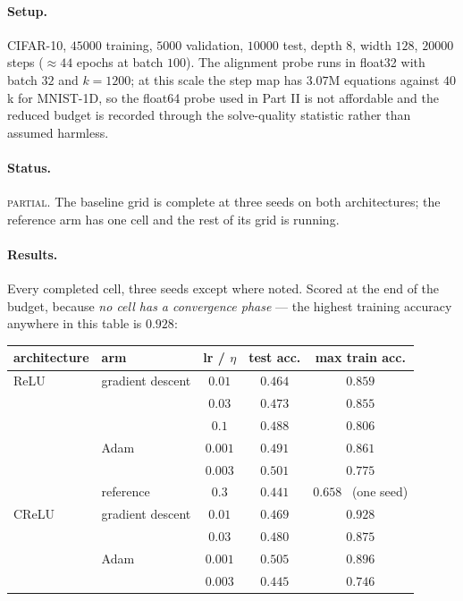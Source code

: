 \documentclass{article} %
\theoremstyle{plain}
\theoremstyle{definition}
\theoremstyle{remark}
\begin{document}
\paragraph{Setup.}
CIFAR-10, $45000$ training, $5000$ validation, $10000$ test, depth $8$, width $128$, $20000$ steps
($\approx 44$ epochs at batch $100$). The alignment probe runs in float32 with batch $32$ and
$k = 1200$; at this scale the step map has $3.07$M equations against $40$k for MNIST-1D, so the
float64 probe used in Part II is not affordable and the reduced budget is recorded through the
solve-quality statistic rather than assumed harmless.

\paragraph{Status.} \textsc{partial}. The baseline grid is complete at three seeds on both
architectures; the reference arm has one cell and the rest of its grid is running.

\paragraph{Results.} Every completed cell, three seeds except where noted. Scored at the end of the
budget, because \emph{no cell has a convergence phase} --- the highest training accuracy anywhere
in this table is $0.928$:

\begin{center}\small
\begin{tabular}{llccc}
\toprule
architecture & arm & lr / $\eta$ & test acc. & max train acc. \\
\midrule
ReLU  & gradient descent & $0.01$  & $0.464$ & $0.859$ \\
      &                  & $0.03$  & $0.473$ & $0.855$ \\
      &                  & $0.1$   & $0.488$ & $0.806$ \\
      & Adam             & $0.001$ & $0.491$ & $0.861$ \\
      &                  & $0.003$ & $\mathbf{0.501}$ & $0.775$ \\
      & reference        & $0.3$   & $0.441$ & $0.658$ \ \small(one seed) \\
\midrule
CReLU & gradient descent & $0.01$  & $0.469$ & $\mathbf{0.928}$ \\
      &                  & $0.03$  & $0.480$ & $0.875$ \\
      & Adam             & $0.001$ & $\mathbf{0.505}$ & $0.896$ \\
      &                  & $0.003$ & $0.445$ & $0.746$ \\
\bottomrule
\end{tabular}
\end{center}
\end{document}
